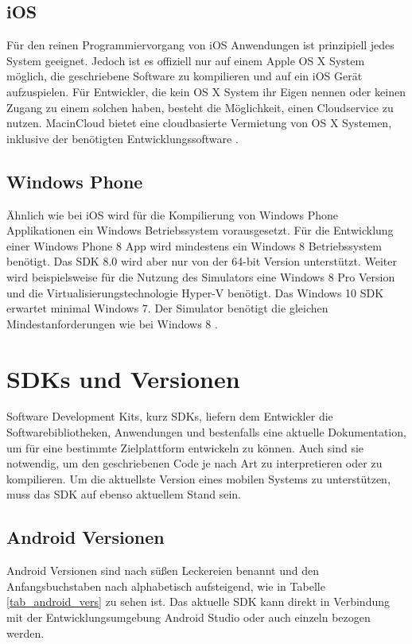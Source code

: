 \subsection{iOS}
Für den reinen Programmiervorgang von iOS Anwendungen ist prinzipiell jedes System geeignet. Jedoch ist es offiziell nur auf einem Apple OS X System möglich, die geschriebene Software zu kompilieren und auf ein iOS Gerät aufzuspielen. Für Entwickler, die kein OS X System ihr Eigen nennen oder keinen Zugang zu einem solchen haben, besteht die Möglichkeit, einen Cloudservice zu nutzen. MacinCloud bietet eine cloudbasierte Vermietung von OS X Systemen, inklusive der benötigten Entwicklungssoftware \citep{macincloud}. 


\subsection{Windows Phone}
Ähnlich wie bei iOS wird für die Kompilierung von Windows Phone Applikationen ein Windows Betriebssystem vorausgesetzt. Für die Entwicklung einer Windows Phone 8 App wird mindestens ein Windows 8 Betriebssystem benötigt. Das SDK 8.0 wird aber nur von der 64-bit Version unterstützt. Weiter wird beispielsweise für die Nutzung des Simulators eine Windows 8 Pro Version und die Virtualisierungstechnologie Hyper-V benötigt. Das Windows 10 SDK erwartet minimal Windows 7. Der Simulator benötigt die gleichen Mindestanforderungen wie bei Windows 8 \citep{WP8_requirements, WP10_SDK, WP10_Emulator}. 


\section{SDKs und Versionen}
Software Development Kits, kurz SDKs, liefern dem Entwickler die Softwarebibliotheken, Anwendungen und bestenfalls eine aktuelle Dokumentation, um für eine bestimmte Zielplattform entwickeln zu können. Auch sind sie notwendig, um den geschriebenen Code je nach Art zu interpretieren oder zu kompilieren. Um die aktuellste Version eines mobilen Systems zu unterstützen, muss das SDK auf ebenso aktuellem Stand sein.

\pagebreak

\subsection{Android Versionen}
Android Versionen sind nach süßen Leckereien benannt und den Anfangsbuchstaben nach alphabetisch aufsteigend, wie in Tabelle \ref{tab_android_vers} zu sehen ist.
Das aktuelle SDK kann direkt in Verbindung mit der Entwicklungsumgebung Android Studio oder auch einzeln bezogen werden.

